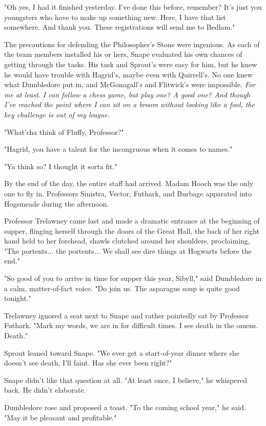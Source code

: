 \documentclass[a4paper,11pt]{article}
\begin{document}
"Oh yes, I had it finished yesterday. I've done this before, remember? It's just you youngsters who have to make up something new. Here, I have that list somewhere. And thank you. These registrations will send me to Bedlam."

The precautions for defending the Philosopher's Stone were ingenious. As each of the team members installed his or hers, Snape evaluated his own chances of getting through the tasks. His task and Sprout's were easy for him, but he knew he would have trouble with Hagrid's, maybe even with Quirrell's. No one knew what Dumbledore put in, and McGonagall's and Flitwick's were impossible. \emph{For me at least. I can follow a chess game, but play one? A good one? And though I've reached the point where I can sit on a broom without looking like a fool, the key challenge is out of my league.}

"What'cha think of Fluffy, Professor?"

"Hagrid, you have a talent for the incongruous when it comes to names."

"Ya think so? I thought it sorta fit."

By the end of the day, the entire staff had arrived. Madam Hooch was the only one to fly in. Professors Sinistra, Vector, Futhark, and Burbage apparated into Hogsmeade during the afternoon.

Professor Trelawney came last and made a dramatic entrance at the beginning of supper, flinging herself through the doors of the Great Hall, the back of her right hand held to her forehead, shawls clutched around her shoulders, proclaiming, "The portents... the portents... We shall see dire things at Hogwarts before the end."

"So good of you to arrive in time for supper this year, Sibyll," said Dumbledore in a calm, matter-of-fact voice. "Do join us. The asparagus soup is quite good tonight."

Trelawney ignored a seat next to Snape and rather pointedly sat by Professor Futhark. "Mark my words, we are in for difficult times. I see death in the omens. Death."

Sprout leaned toward Snape. "We ever get a start-of-year dinner where she doesn't see death, I'll faint. Has she ever been right?"

Snape didn't like that question at all. "At least once, I believe," he whispered back. He didn't elaborate.

Dumbledore rose and proposed a toast. "To the coming school year," he said. "May it be pleasant and profitable."
\end{document}

